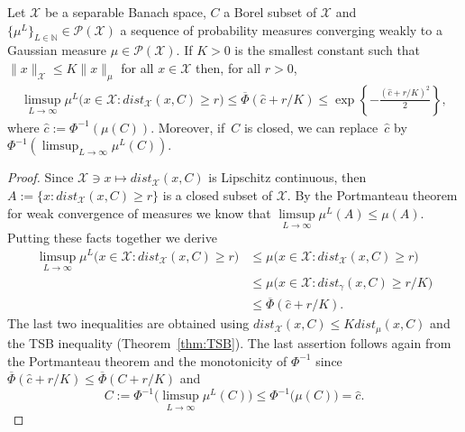 \documentclass[twoside,11pt]{article}
\numberwithin{equation}{section}
\numberwithin{theorem}{section}
\newcommand{\X}{\mathcal{X}}
\newcommand{\N}{\mathbb{N}}
\begin{document}
\begin{proposition}\label{prop:nonGaussianTSB} Let $\X$ be a separable Banach space, $C$ a Borel subset of $\X$ and $\{\mu^L\}_{L\in\N}\in \mathscr{P}(\X)$ a sequence of probability measures converging weakly to a Gaussian measure $\mu \in \mathscr{P}(\X)$. If  $K>0$ is the smallest constant such that  $\|x\|_{\X}\leq K\| x\|_{\mu}$
for all $x\in\X$
then, for all $r>0$,
\begin{equation*}
    \begin{aligned}       \limsup_{L\to\infty}\mu^L\bigg( x\in\X: dist_\X(x, C)\geq r     \bigg)
 \leq \overline{\Phi}(\widehat{c}+r/K)\leq 
 \exp\left\{-\frac{(\widehat{c}+r/K)^2}{2}\right\},
    \end{aligned}
\end{equation*}
where $\widehat{c}:=\Phi^{-1}(\mu(C))$. Moreover, if~$C$ is closed, we can replace~$\widehat{c}$ by $\Phi^{-1}(\limsup_{L\to\infty}\mu^L(C))$.
\end{proposition}

\begin{proof} 
Since $\X\ni x\mapsto dist_{\X}(x, C)$ is Lipschitz continuous, then $A:=\{x: dist_{\X}(x, C)\geq r\}$ is a closed subset of $\X$. 
By the Portmanteau theorem for weak convergence of measures we know that $\limsup\limits_{L\to\infty}\mu^L(A)\leq \mu(A)$. Putting these facts together we derive
\begin{align*}
\limsup_{L\to\infty}\mu^L\bigg( x\in\X: dist_\X(x, C)\geq r     \bigg)&\leq  \mu\bigg( x\in\X: dist_\X(x, C)\geq r     \bigg)\\&\leq
        \mu\bigg( x\in\X: dist_\gamma(x, C)\geq r/K     \bigg)
 \\&\leq \overline{\Phi}(\widehat{c}+r/K).
\end{align*}
The last two inequalities are obtained using $dist_{\X}(x, C)\leq K dist_{\mu}(x, C)$
and the TSB inequality (Theorem~\ref{thm:TSB}). The last assertion follows again from the Portmanteau theorem and the monotonicity of $\Phi^{-1}$ since 
$\overline{\Phi}(\widehat{c}+r/K)\leq \overline{\Phi}(C+r/K)$
and
$$  C:=\Phi^{-1}\bigg(\limsup_{L\to\infty}\mu^L(C)\bigg)\leq \Phi^{-1}\bigg(\mu(C)\bigg) =\widehat{c}.
$$
\end{proof}
\end{document}
